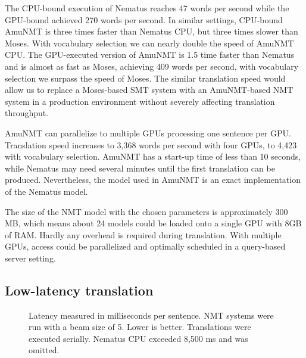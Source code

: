 \documentclass[11pt]{article}
\begin{document}
The CPU-bound execution of Nematus reaches 47 words per second while the GPU-bound achieved 270 words per second. In similar settings, CPU-bound AmuNMT is three times faster than Nematus CPU, but three times slower than Moses. With vocabulary selection we can nearly double the speed of AmuNMT CPU. The GPU-executed version of AmuNMT is 1.5 time faster than Nematus and is almost as fast as Moses, achieving 409 words per second, with vocabulary selection we surpass the speed of Moses. The similar translation speed would allow us to replace a Moses-based SMT system with an AmuNMT-based NMT system in a production environment without severely affecting translation throughput. 

AmuNMT can parallelize to multiple GPUs processing one sentence per GPU. Translation speed increases to 3,368 words per second with four GPUs, to 4,423 with vocabulary selection. 
AmuNMT has a start-up time of less than 10 seconds, while Nematus may need several minutes until the first translation can be produced. Nevertheless, the model used in AmuNMT is an exact implementation of the Nematus model.

The size of the NMT model with the chosen parameters is approximately 300 MB, which means about 24 models could be loaded onto a single GPU with 8GB of RAM. Hardly any overhead is required during translation. With multiple GPUs, access could be parallelized and optimally scheduled in a query-based server setting. 

\subsection{Low-latency translation}

\begin{figure}[t]
\centering
{}
\caption{Latency measured in milliseconds per sentence. NMT systems were run with a beam size of 5. Lower is better. Translations were executed serially. Nematus CPU exceeded 8,500 ms and was omitted.}\label{latency}
\end{figure}
\end{document}

